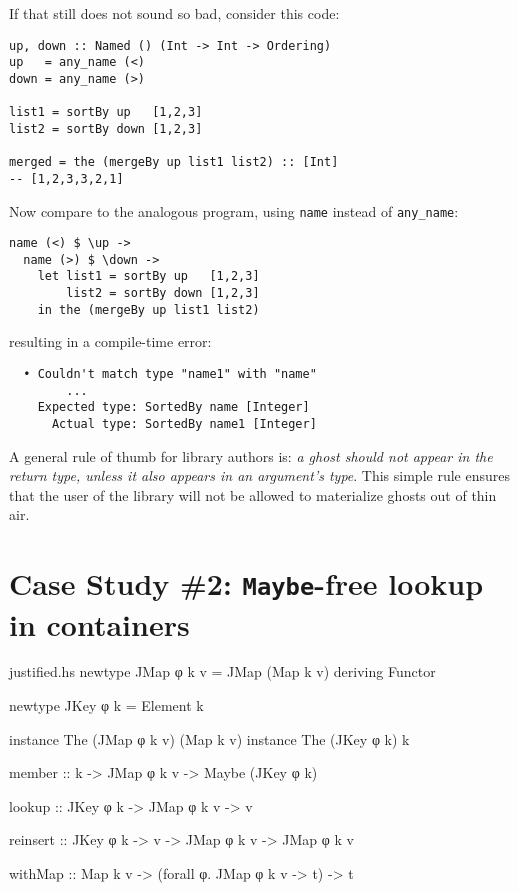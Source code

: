 \documentclass[format=sigplan, review=false, screen=true]{acmart}
\begin{document}
If that still does not sound so bad, consider this code:

\begin{verbatim}
up, down :: Named () (Int -> Int -> Ordering)
up   = any_name (<)
down = any_name (>)

list1 = sortBy up   [1,2,3]
list2 = sortBy down [1,2,3]

merged = the (mergeBy up list1 list2) :: [Int]
-- [1,2,3,3,2,1]
\end{verbatim}

Now compare to the analogous program, using \texttt{name} instead of \texttt{any\_name}:
\begin{verbatim}
name (<) $ \up ->
  name (>) $ \down ->
    let list1 = sortBy up   [1,2,3]
        list2 = sortBy down [1,2,3]
    in the (mergeBy up list1 list2)
\end{verbatim}

resulting in a compile-time error:

\begin{lstlisting}
  • Couldn't match type "name1" with "name"
        ...
    Expected type: SortedBy name [Integer]
      Actual type: SortedBy name1 [Integer]
\end{lstlisting}

A general rule of thumb for library authors is: \emph{a ghost should not appear in the return type,
  unless it also appears in an argument's type}. This simple rule ensures that
the user of the library will not be allowed to materialize ghosts out of thin air.

\section{Case Study \#2: \texttt{Maybe}-free lookup in containers}

\begin{filecontents*}{justified.hs}
newtype JMap φ k v = JMap (Map k v)
    deriving Functor

newtype JKey φ k = Element k

instance The (JMap φ k v) (Map k v)
instance The (JKey φ k)  k

member ::  k -> JMap φ k v -> Maybe (JKey φ k)

lookup   :: JKey φ k -> JMap φ k v -> v

reinsert
  :: JKey φ k -> v -> JMap φ k v -> JMap φ k v

withMap
  :: Map k v  -> (forall φ. JMap φ k v -> t) -> t
\end{filecontents*}
\end{document}
